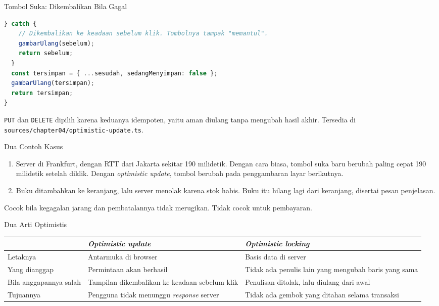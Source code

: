 \documentclass[aspectratio=169, table, 12pt]{beamer}
\begin{document}
\begin{frame}[fragile]{{\Large Tombol Suka: Dikembalikan Bila Gagal}}
  \vspace{4pt}
\begin{lstlisting}[language=TypeScript]
  } catch {
    // Dikembalikan ke keadaan sebelum klik. Tombolnya tampak "memantul".
    gambarUlang(sebelum);
    return sebelum;
  }
  const tersimpan = { ...sesudah, sedangMenyimpan: false };
  gambarUlang(tersimpan);
  return tersimpan;
}
\end{lstlisting}

  \vspace{4pt}
  {\footnotesize \texttt{PUT} dan \texttt{DELETE} dipilih karena keduanya
  idempoten, yaitu aman diulang tanpa mengubah hasil akhir. Tersedia di
  \texttt{sources/chapter04/optimistic-update.ts}.}
\end{frame}

\begin{frame}{{\Large Dua Contoh Kasus}}
  \vspace{8pt}
  \begin{enumerate}
    \item Server di Frankfurt, dengan RTT dari Jakarta sekitar 190 milidetik.
          Dengan cara biasa, tombol suka baru berubah paling cepat 190
          milidetik setelah diklik. Dengan \textit{optimistic update}, tombol
          berubah pada penggambaran layar berikutnya.
    \item Buku ditambahkan ke keranjang, lalu server menolak karena stok
          habis. Buku itu hilang lagi dari keranjang, disertai pesan
          penjelasan.
  \end{enumerate}
  \vspace{6pt}
  {\footnotesize Cocok bila kegagalan jarang dan pembatalannya tidak merugikan.
  Tidak cocok untuk pembayaran.}
\end{frame}

\begin{frame}{{\Large Dua Arti Optimistis}}
  \vspace{6pt}
  \centering
  {\small
  \begin{tabularx}{\textwidth}{lYY}
    \hline
     & \textbf{\textit{Optimistic update}} & \textbf{\textit{Optimistic locking}} \\
    \hline
    Letaknya & Antarmuka di browser & Basis data di server \\
    \hline
    Yang dianggap & Permintaan akan berhasil & Tidak ada penulis lain yang mengubah baris yang sama \\
    \hline
    Bila anggapannya salah & Tampilan dikembalikan ke keadaan sebelum klik & Penulisan ditolak, lalu diulang dari awal \\
    \hline
    Tujuannya & Pengguna tidak menunggu \textit{response} server & Tidak ada gembok yang ditahan selama transaksi \\
    \hline
  \end{tabularx}}
\end{frame}
\end{document}
